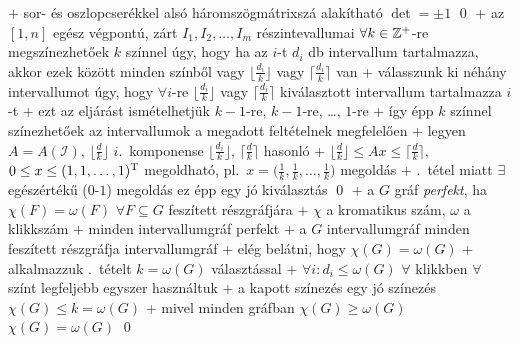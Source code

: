       + sor- és oszlopcserékkel alsó háromszögmátrixszá alakítható \RA%
      $\det = \pm 1$ \qed
+ \thm \label{thm:liprog:app:interval}az $[1, n]$ egész végpontú, zárt
  $I_1, I_2, \ldots, I_m$
  részintevallumai $\forall k \in \mathbb{Z}^{+}$-re megszínezhetőek $k$
  színnel úgy, hogy ha az $i$-t $d_i$ db intervallum tartalmazza,
  akkor ezek között minden színből vagy $\bigl\lfloor \frac{d_i}{k}
  \bigr\rfloor$ vagy $\bigl\lceil \frac{d_i}{k} \bigr\rceil$ van
  + \proof válasszunk ki néhány intervallumot úgy, hogy $\forall i$-re
    $\bigl\lfloor \frac{d_i}{k} \bigr\rfloor$ vagy $\bigl\lceil
    \frac{d_i}{k} \bigr\rceil$ kiválasztott intervallum tartalmazza
    $i$-t
    + ezt az eljárást ismételhetjük $k - 1$-re, $k - 1$-re, \ldots, $1$-re
    + így épp $k$ színnel színezhetőek az intervallumok a megadott
      feltételnek megfelelően
  + legyen $A = A(\mathcal{I})$,
    $\bigl\lfloor \frac{d}{k} \bigr\rfloor$ $i$.~komponense
    $\bigl\lfloor \frac{d_i}{k} \bigr\rfloor$, $\bigl\lceil \frac{d}{k}
    \bigr\rceil$ hasonló
  + $\bigl\lfloor \frac{d}{k} \bigr\rfloor \le A x \le
    \bigl\lceil \frac{d}{k} \bigr\rceil$, $0 \le x \le (1, 1, \ldots,
    1)^{\mathrm{T}}$ megoldható, pl.~$x = \bigl( \frac{1}{k}, \frac{1}{k},
    \ldots, \frac{1}{k} \bigr)$ megoldás
    + .~tétel miatt $\exists$ egészértékű
      ($0$-$1$) megoldás \RA ez épp egy jó kiválasztás \qed
+ \dfn a $G$ gráf \emph{perfekt}, ha $\chi(F) = \omega(F)$ $\forall F
  \subseteq G$ feszített részgráfjára
  + $\chi$ a kromatikus szám, $\omega$ a klikkszám
+ \corr minden intervallumgráf perfekt
  + \proof a $G$ intervallumgráf minden feszített részgráfja intervallumgráf
    + elég belátni, hogy $\chi(G) = \omega(G)$
  + alkalmazzuk .~tételt $k =
    \omega(G)$ választással
    + $\forall i: d_i \le \omega(G)$ \RA $\forall$ klikkben $\forall$ színt
      legfeljebb egyszer használtuk
    + a kapott színezés egy jó színezés \RA $\chi(G) \le k = \omega(G)$
  + mivel minden gráfban $\chi(G) \ge \omega(G)$ \RA $\chi(G) =
    \omega(G)$ \qed


